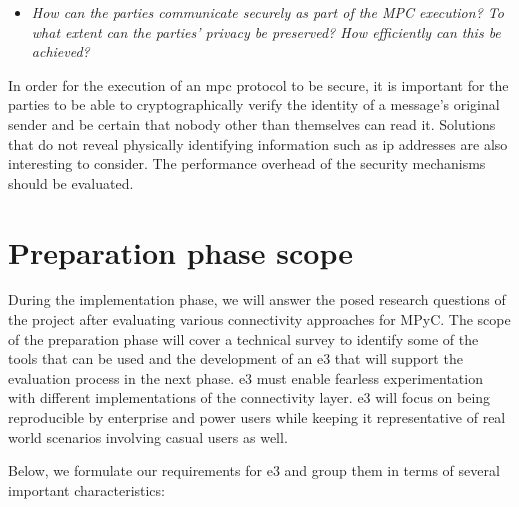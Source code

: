 \begin{itemize}
\tightlist
\item
  \emph{How can the parties communicate securely as part of the MPC
  execution? To what extent can the parties' privacy be preserved? How
  efficiently can this be achieved?}
\end{itemize}

In order for the execution of an \gls{mpc} protocol to be secure, it is
important for the parties to be able to cryptographically verify the
identity of a message's original sender and be certain that nobody other
than themselves can read it. Solutions that do not reveal physically
identifying information such as \gls{ip} addresses are also interesting
to consider. The performance overhead of the security mechanisms should
be evaluated.

\hypertarget{preparation-phase-scope}{%
\section{Preparation phase scope}\label{preparation-phase-scope}}

During the implementation phase, we will answer the posed research
questions of the project after evaluating various connectivity
approaches for MPyC. The scope of the preparation phase will cover a
technical survey to identify some of the tools that can be used and the
development of an \gls{e3} that will support the evaluation process in
the next phase. \gls{e3} must enable fearless experimentation with
different implementations of the connectivity layer. \gls{e3} will focus
on being reproducible by enterprise and power users while keeping it
representative of real world scenarios involving casual users as well.

Below, we formulate our requirements for \gls{e3} and group them in
terms of several important characteristics:

